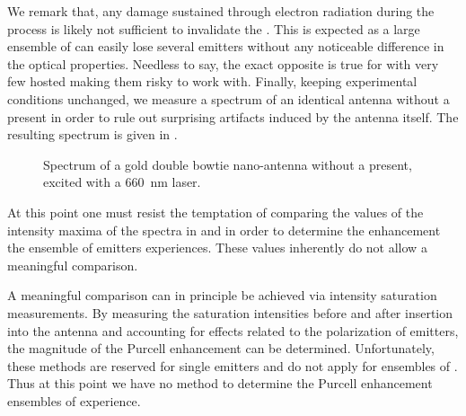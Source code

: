 			We remark that, any damage sustained through electron radiation during the \pp process is likely not sufficient to invalidate the \nd. This is expected as a large ensemble of \sivs can easily lose several emitters without any noticeable difference in the optical properties. Needless to say, the exact opposite is true for \nds with very few hosted \sivs making them risky to work with.
			Finally, keeping experimental conditions unchanged, we measure a spectrum of an identical antenna without a \nd present in order to rule out surprising artifacts induced by the antenna itself. The resulting spectrum is given in .

				\begin{figure}[!htb]
					\centering
					\caption[Spectrum of a double bowtie antenna without \nd]{Spectrum of a gold double bowtie nano-antenna without a \nd present, excited with a \SI{660}{\nm} \cw laser.}
					\label{fig::spectrum_antenna_no_nd}
				\end{figure}

			At this point one must resist the temptation of comparing the values of the intensity maxima of the spectra in  and  in order to determine the enhancement the ensemble of emitters experiences. These values inherently do not allow a meaningful comparison.
		
			A meaningful comparison can in principle be achieved via intensity saturation measurements. By measuring the saturation intensities before and after insertion into the antenna and accounting for effects related to the polarization of emitters, the magnitude of the Purcell enhancement can be determined. Unfortunately, these methods are reserved for single emitters and do not apply for ensembles of \sivs. Thus at this point we have no method to determine the Purcell enhancement ensembles of \sivs experience.
		
